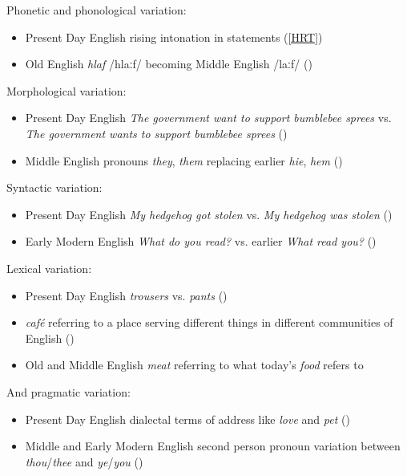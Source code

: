\noindent Phonetic and phonological variation:
\begin{itemize}
    \item Present Day English rising intonation in statements (\ref{HRT})
    \item Old English \textit{hlaf} /hlaːf/ becoming Middle English /laːf/ ()
\end{itemize}

\noindent Morphological variation:
\begin{itemize}
    \item Present Day English \textit{The government want to support bumblebee sprees} vs. \textit{The government wants to support bumblebee sprees} {()}
    \item Middle English pronouns \emph{they}, \emph{them} replacing earlier \emph{hie}, \emph{hem} {()}
\end{itemize}

\noindent Syntactic variation:
\begin{itemize}
    \item Present Day English \textit{My hedgehog got stolen} vs. \textit{My hedgehog was stolen} ()
    \item Early Modern English \textit{What do you read?} vs. earlier \textit{What read you?} ()
\end{itemize}

\noindent Lexical variation:
\begin{itemize}
    \item Present Day English \textit{trousers} vs. \textit{pants} ()
    \item \textit{caf\'{e}} referring to a place serving different things in different communities of English ()
    \item Old and Middle English \textit{meat} referring to what today's \textit{food} refers to
\end{itemize}

\noindent And pragmatic variation:
\begin{itemize}
    \item Present Day English dialectal terms of address like \emph{love} and \emph{pet} ()
    \item Middle and Early Modern English second person pronoun variation between \emph{thou}/\emph{thee} and \emph{ye}/\emph{you} ()
\end{itemize} 

